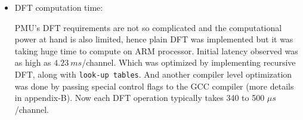 \begin{itemize}
	\item DFT computation time:
	
	 
	PMU's DFT requirements are not so complicated and the computational power at hand is also limited, hence plain DFT was implemented but it was taking huge time to compute on ARM processor. Initial latency observed was as high as $4.23 ~ms$/channel. Which was optimized by implementing recursive DFT, along with \texttt{look-up tables}. And another compiler level optimization was done by passing special control flags to the GCC compiler (more details in appendix-B). Now each DFT operation typically takes 340 to 500 $\mu s$/channel. 
	
	
\end{itemize}